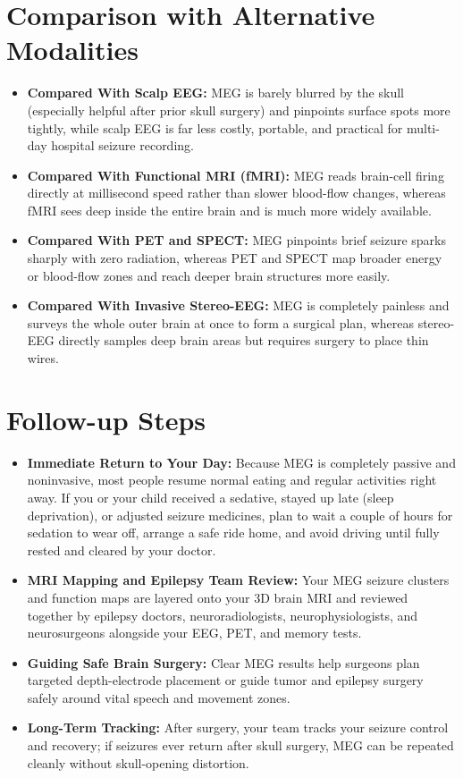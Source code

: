 \section{Comparison with Alternative Modalities}
\begin{itemize}
  \item \textbf{Compared With Scalp EEG:} MEG is barely blurred by the skull (especially helpful after prior skull surgery) and pinpoints surface spots more tightly, while scalp EEG is far less costly, portable, and practical for multi-day hospital seizure recording.
  \item \textbf{Compared With Functional MRI (fMRI):} MEG reads brain-cell firing directly at millisecond speed rather than slower blood-flow changes, whereas fMRI sees deep inside the entire brain and is much more widely available.
  \item \textbf{Compared With PET and SPECT:} MEG pinpoints brief seizure sparks sharply with zero radiation, whereas PET and SPECT map broader energy or blood-flow zones and reach deeper brain structures more easily.
  \item \textbf{Compared With Invasive Stereo-EEG:} MEG is completely painless and surveys the whole outer brain at once to form a surgical plan, whereas stereo-EEG directly samples deep brain areas but requires surgery to place thin wires.
\end{itemize}

\section{Follow-up Steps}
\begin{itemize}
  \item \textbf{Immediate Return to Your Day:} Because MEG is completely passive and noninvasive, most people resume normal eating and regular activities right away. If you or your child received a sedative, stayed up late (sleep deprivation), or adjusted seizure medicines, plan to wait a couple of hours for sedation to wear off, arrange a safe ride home, and avoid driving until fully rested and cleared by your doctor.
  \item \textbf{MRI Mapping and Epilepsy Team Review:} Your MEG seizure clusters and function maps are layered onto your 3D brain MRI and reviewed together by epilepsy doctors, neuroradiologists, neurophysiologists, and neurosurgeons alongside your EEG, PET, and memory tests.
  \item \textbf{Guiding Safe Brain Surgery:} Clear MEG results help surgeons plan targeted depth-electrode placement or guide tumor and epilepsy surgery safely around vital speech and movement zones.
  \item \textbf{Long-Term Tracking:} After surgery, your team tracks your seizure control and recovery; if seizures ever return after skull surgery, MEG can be repeated cleanly without skull-opening distortion.
\end{itemize}


